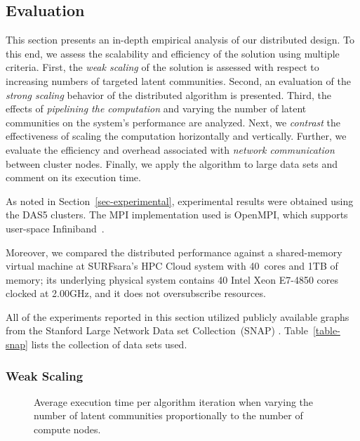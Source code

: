 \subsection{Evaluation}

This section presents an in-depth empirical analysis of our distributed design.
To this end, we assess the scalability and
efficiency of the solution using multiple criteria.
%
First, the \textit{weak scaling} of the solution is assessed with respect to increasing
numbers of targeted latent communities.
%
Second, an evaluation of the \textit{strong scaling} behavior of the distributed
algorithm is presented.
%
Third, the effects of \textit{pipelining the computation} and varying the number of latent communities on the system's
performance are analyzed.
%
Next, we \textit{contrast} the effectiveness of scaling the computation horizontally
and vertically.
%
Further, we evaluate the efficiency and overhead associated with \textit{network
communication} between cluster nodes.
%
Finally, we apply the algorithm to large data sets and comment on its execution time.

As noted in Section~\ref{sec-experimental}, experimental results
were obtained using the DAS5 clusters.
The MPI implementation used is OpenMPI, which supports
user-space Infiniband~\cite{gabriel04:_open_mpi}.

Moreover, we compared the distributed performance against a shared-memory virtual machine
at SURFsara's HPC Cloud system with 40~cores and 1TB of memory; its underlying
physical system contains 40 Intel Xeon E7-4850 cores clocked at 2.00GHz, and
it does not oversubscribe resources.

All of the experiments reported in this section utilized
publicly available graphs from the Stanford Large Network Data set
Collection~(SNAP) \cite{snapnets}. Table~\ref{table-snap} lists the
collection of data sets used.

\subsubsection{Weak Scaling}

\begin{figure}[tb] %
  \centering
  \caption{Average execution time per algorithm iteration when varying
  the number of latent communities proportionally to the number of compute
  nodes.}
  \label{fig-weak-scaling}
\end{figure}

